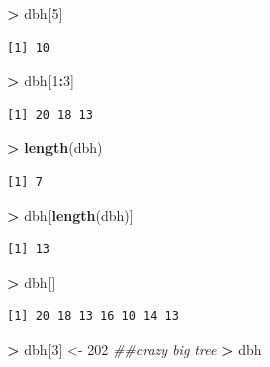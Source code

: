 \documentclass[]{krantz}
\makeatletter
\newenvironment{Shaded}{\begin{snugshade}}{\end{snugshade}}
\newcommand{\CommentTok}[1]{\textcolor[rgb]{0.37,0.37,0.37}{\textit{#1}}}
\newcommand{\DecValTok}[1]{\textcolor[rgb]{0.06,0.06,0.06}{#1}}
\newcommand{\KeywordTok}[1]{\textcolor[rgb]{0.27,0.27,0.27}{\textbf{#1}}}
\newcommand{\NormalTok}[1]{#1}
\newcommand{\OperatorTok}[1]{\textcolor[rgb]{0.43,0.43,0.43}{\textbf{#1}}}
\newcommand{\StringTok}[1]{\textcolor[rgb]{0.5,0.5,0.5}{#1}}
\newenvironment{kframe}{%
\medskip{}
\setlength{\fboxsep}{.8em}
 \def\at@end@of@kframe{}%
 \ifinner\ifhmode%
  \def\at@end@of@kframe{\end{minipage}}%
  \begin{minipage}{\columnwidth}%
 \fi\fi%
 \def\FrameCommand##1{\hskip\@totalleftmargin \hskip-\fboxsep
 \colorbox{shadecolor}{##1}\hskip-\fboxsep
     \hskip-\linewidth \hskip-\@totalleftmargin \hskip\columnwidth}%
 \MakeFramed {\advance\hsize-\width
   \@totalleftmargin\z@ \linewidth\hsize
   \@setminipage}}%
 {\par\unskip\endMakeFramed%
 \at@end@of@kframe}
\renewenvironment{Shaded}{\begin{kframe}}{\end{kframe}}
\makeatother
\begin{document}
\begin{Shaded}
\begin{Highlighting}[]
\OperatorTok{>}\StringTok{ }\NormalTok{dbh[}\DecValTok{5}\NormalTok{]}
\end{Highlighting}
\end{Shaded}

\begin{verbatim}
[1] 10
\end{verbatim}

\begin{Shaded}
\begin{Highlighting}[]
\OperatorTok{>}\StringTok{ }\NormalTok{dbh[}\DecValTok{1}\OperatorTok{:}\DecValTok{3}\NormalTok{]}
\end{Highlighting}
\end{Shaded}

\begin{verbatim}
[1] 20 18 13
\end{verbatim}

\begin{Shaded}
\begin{Highlighting}[]
\OperatorTok{>}\StringTok{ }\KeywordTok{length}\NormalTok{(dbh)}
\end{Highlighting}
\end{Shaded}

\begin{verbatim}
[1] 7
\end{verbatim}

\begin{Shaded}
\begin{Highlighting}[]
\OperatorTok{>}\StringTok{ }\NormalTok{dbh[}\KeywordTok{length}\NormalTok{(dbh)]}
\end{Highlighting}
\end{Shaded}

\begin{verbatim}
[1] 13
\end{verbatim}

\begin{Shaded}
\begin{Highlighting}[]
\OperatorTok{>}\StringTok{ }\NormalTok{dbh[]}
\end{Highlighting}
\end{Shaded}

\begin{verbatim}
[1] 20 18 13 16 10 14 13
\end{verbatim}

\begin{Shaded}
\begin{Highlighting}[]
\OperatorTok{>}\StringTok{ }\NormalTok{dbh[}\DecValTok{3}\NormalTok{] <-}\StringTok{ }\DecValTok{202}  \CommentTok{##crazy big tree}
\OperatorTok{>}\StringTok{ }\NormalTok{dbh}
\end{Highlighting}
\end{Shaded}
\end{document}

